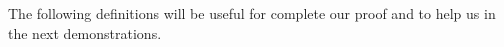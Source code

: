 \documentclass[9pt]{entcs}
\newtheorem{teo}[thm]{Theorem}%
\begin{document}


The following definitions will be useful for complete our proof and to help us in the next demonstrations.



\end{document}
